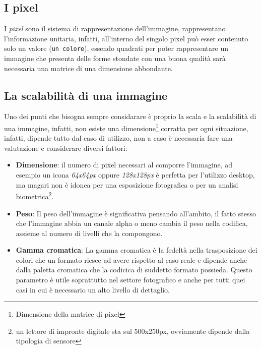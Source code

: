 \documentclass{report}
\begin{document}
\subsection{I pixel}
\label{sec:pixel}

I \textit{pixel} sono il sistema di rappresentazione dell'immagine,
rappresentano l'informazione unitaria, infatti, all'interno del singolo
pixel può esser contenuto solo un valore (\texttt{un colore}), essendo
quadrati per poter rappresentare un immagine che presenta delle forme
stondate con una buona qualità sarà necessaria una matrice di una
dimensione abbondante.
\subsection{La scalabilità di una immagine}
\label{sec:scala}
Uno dei punti che bisogna sempre considarare è proprio la scala e
la scalabilità di una immagine, infatti, non esiste una
dimensione\footnote{Dimensione della matrice di pixel} corratta per ogni
situazione, infatti, dipende tutto dal caso di utilizzo, non a caso è
necessaria fare una valutazione e considerare diversi fattori:
\begin{itemize}
\item \textbf{Dimensione}: il numero di pixel necessari al comporre
  l'immagine, ad esempio un icona \textit{64x64px} oppure
  \textit{128x128px} è perfetta per l'utilizzo desktop, ma magari non è
  idonea per una esposizione fotografica o per un analisi
  biometrica\footnote{un lettore di impronte digitale sta sul
    500x250px, ovviamente dipende dalla tipologia di sensore}.
\item \textbf{Peso}: Il peso dell'immagine è significativa pensando
  all'ambito, il fatto stesso che l'immagine abbia un canale alpha o
  meno cambia il peso nella codifica, assieme al numero di livelli che
  la compongono. 
\item \textbf{Gamma cromatica}: La gamma cromatica è la fedeltà nella
  trasposizione dei colori che un formato riesce ad avere rispetto al
  caso reale e dipende anche dalla paletta cromatica che la codicica di
  suddetto formato possieda. Questo parametro è utile soprattutto nel
  settore fotografico e anche per tutti quei casi in cui è necessario
  un alto livello di dettaglio.
\end{itemize}
\end{document}
